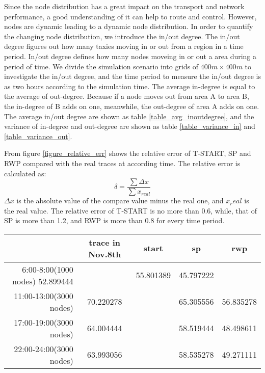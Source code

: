 Since the node distribution has a great impact on the transport and network performance, a good understanding of it can help to route and control.  However, nodes are dynamic leading to a dynamic node distribution. In order to quantify the changing node distribution,  we introduce the in/out degree. The in/out degree figures out how many taxies moving in or out from a region in a time period. In/out degree defines how many nodes moveing in or out a area during a period of time. 
We divide the simulation scenario into grids of $ 400m \times 400 m$ to investigate the in/out degree, and the time period to measure the in/out degree is as two hours according to the simulation time. 
The average in-degree is equal to the average of out-degree. Because if a node moves out from area A to area B, the in-degree of B adds on one, meanwhile, the out-degree of area A adds on one. The average in/out degree are shown as table \ref{table_avg_inoutdegree}, and the variance of in-degree and out-degree are shown as table \ref{table_variance_in} and \ref{table_variance_out}.

From figure \ref{figure_relative_err} shows the relative error of T-START, SP and RWP compared with the real traces at according time.
The relative error is calculated as:
\begin{equation}
    \delta = \frac{\sum \Delta x}{\sum x_{real}} 
\end{equation}
$\Delta x$ is the absolute value of the compare value minus the real one, and $x_real$ is the real value.
The relative error of T-START is no more than 0.6, while, that of SP is more than 1.2,  and RWP is more than 0.8 for every time period. 
\begin{table*}[!t]
\caption{Average in/out degree.}\label{table_avg_inoutdegree}
\centering
\begin{tabular}{r|c|c|c|c}
\hline
	&trace in Nov.8th	&start	&sp	&rwp	\\
\hline
6:00-8:00(1000 nodes)
52.899444&&55.801389	&45.797222\\
\hline
11:00-13:00(3000 nodes)&
70.220278&&	65.305556&	56.835278\\  
\hline
17:00-19:00(3000 nodes)&
64.004444&&	58.519444&	48.498611\\
\hline
22:00-24:00(3000 nodes)&
63.993056&&	58.535278&	49.271111\\	
\hline
\end{tabular}
\end{table*}

